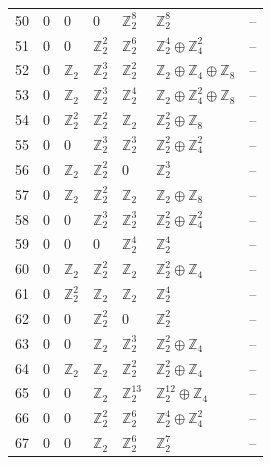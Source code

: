 \documentclass[10pt]{article}
\begin{document}
\begin{longtable}{rlllllr}
50 & $0$ & $0$ & $0$ & $\mathbb{Z}_{2}^{8}$ & $\mathbb{Z}_{2}^{8}$ & -- \\
51 & $0$ & $0$ & $\mathbb{Z}_{2}^{2}$ & $\mathbb{Z}_{2}^{6}$ & $\mathbb{Z}_{2}^{4}\oplus \mathbb{Z}_{4}^{2}$ & -- \\
52 & $0$ & $\mathbb{Z}_{2}$ & $\mathbb{Z}_{2}^{3}$ & $\mathbb{Z}_{2}^{2}$ & $\mathbb{Z}_{2}\oplus \mathbb{Z}_{4}\oplus \mathbb{Z}_{8}$ & -- \\
53 & $0$ & $\mathbb{Z}_{2}$ & $\mathbb{Z}_{2}^{3}$ & $\mathbb{Z}_{2}^{4}$ & $\mathbb{Z}_{2}\oplus \mathbb{Z}_{4}^{2}\oplus \mathbb{Z}_{8}$ & -- \\
54 & $0$ & $\mathbb{Z}_{2}^{2}$ & $\mathbb{Z}_{2}^{2}$ & $\mathbb{Z}_{2}$ & $\mathbb{Z}_{2}^{2}\oplus \mathbb{Z}_{8}$ & -- \\
55 & $0$ & $0$ & $\mathbb{Z}_{2}^{3}$ & $\mathbb{Z}_{2}^{3}$ & $\mathbb{Z}_{2}^{2}\oplus \mathbb{Z}_{4}^{2}$ & -- \\
56 & $0$ & $\mathbb{Z}_{2}$ & $\mathbb{Z}_{2}^{2}$ & $0$ & $\mathbb{Z}_{2}^{3}$ & -- \\
57 & $0$ & $\mathbb{Z}_{2}$ & $\mathbb{Z}_{2}^{2}$ & $\mathbb{Z}_{2}$ & $\mathbb{Z}_{2}\oplus \mathbb{Z}_{8}$ & -- \\
58 & $0$ & $0$ & $\mathbb{Z}_{2}^{3}$ & $\mathbb{Z}_{2}^{3}$ & $\mathbb{Z}_{2}^{2}\oplus \mathbb{Z}_{4}^{2}$ & -- \\
59 & $0$ & $0$ & $0$ & $\mathbb{Z}_{2}^{4}$ & $\mathbb{Z}_{2}^{4}$ & -- \\
60 & $0$ & $\mathbb{Z}_{2}$ & $\mathbb{Z}_{2}^{2}$ & $\mathbb{Z}_{2}$ & $\mathbb{Z}_{2}^{2}\oplus \mathbb{Z}_{4}$ & -- \\
61 & $0$ & $\mathbb{Z}_{2}^{2}$ & $\mathbb{Z}_{2}$ & $\mathbb{Z}_{2}$ & $\mathbb{Z}_{2}^{4}$ & -- \\
62 & $0$ & $0$ & $\mathbb{Z}_{2}^{2}$ & $0$ & $\mathbb{Z}_{2}^{2}$ & -- \\
63 & $0$ & $0$ & $\mathbb{Z}_{2}$ & $\mathbb{Z}_{2}^{3}$ & $\mathbb{Z}_{2}^{2}\oplus \mathbb{Z}_{4}$ & -- \\
64 & $0$ & $\mathbb{Z}_{2}$ & $\mathbb{Z}_{2}$ & $\mathbb{Z}_{2}^{2}$ & $\mathbb{Z}_{2}^{2}\oplus \mathbb{Z}_{4}$ & -- \\
65 & $0$ & $0$ & $\mathbb{Z}_{2}$ & $\mathbb{Z}_{2}^{13}$ & $\mathbb{Z}_{2}^{12}\oplus \mathbb{Z}_{4}$ & -- \\
66 & $0$ & $0$ & $\mathbb{Z}_{2}^{2}$ & $\mathbb{Z}_{2}^{6}$ & $\mathbb{Z}_{2}^{4}\oplus \mathbb{Z}_{4}^{2}$ & -- \\
67 & $0$ & $0$ & $\mathbb{Z}_{2}$ & $\mathbb{Z}_{2}^{6}$ & $\mathbb{Z}_{2}^{7}$ & -- \\

\end{longtable}
\end{document}
